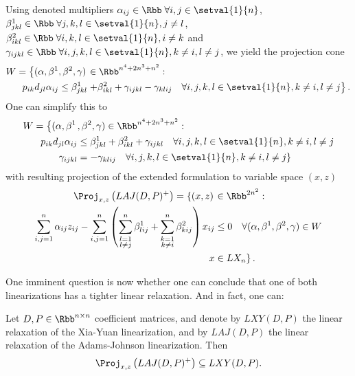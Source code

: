 Using denoted multipliers $\alpha_{ij}\in\Rbb\;\forall i,j\in\setval{1}{n}$, $\beta^1_{jkl}\in\Rbb\;\forall j,k,l\in\setval{1}{n}, j\neq l$, $\beta^2_{ikl}\in\Rbb\;\forall i,k,l\in\setval{1}{n}, i\neq k$ and $\gamma_{ijkl}\in\Rbb\;\forall i,j,k,l\in\setval{1}{n}, k\neq i, l\neq j$, we yield the projection cone
\begin{align*}
	W = \left\{(\alpha,\beta^1,\beta^2,\gamma)\right.&\in\Rbb^{n^4+2n^3+n^2}:\\
	p_{ik}d_{jl}\alpha_{ij}\leq \beta^1_{jkl} &\left.+ \beta^2_{ikl} + \gamma_{ijkl}-\gamma_{klij}\quad\forall i,j,k,l \in\setval{1}{n}, k\neq i, l\neq j\right\}.
\end{align*}
One can simplify this to
\begin{align}
	W = \left\{(\alpha,\beta^1\right.&,\beta^2,\gamma)\in\Rbb^{n^4+2n^3+n^2}:\notag\\
	\label{eq:proj_cone:1}
	p_{ik}d_{jl}\alpha_{ij}&\leq \beta^1_{jkl} + \beta^2_{ikl} + \gamma_{ijkl}\quad\forall i,j,k,l \in\setval{1}{n}, k\neq i, l\neq j\\
	\label{eq:proj_cone:2}
	\gamma_{ijkl}&\left.=-\gamma_{klij}\quad\forall i,j,k,l\in\setval{1}{n}, k\neq i, l\neq j\right\}
\end{align}
with resulting projection of the extended formulation to variable space $(x,z)$
\begin{align*}
	\Proj_{x,z}\left(LAJ(D,P)^+\right) = \left\{(x,z)\right.&\in\Rbb^{2n^2}:\\
	\sum_{i,j=1}^n\alpha_{ij}z_{ij} - \sum_{i,j=1}^n \left(\sum_{\substack{l=1\\l\neq j}}^n \beta^1_{lij} + \sum_{\substack{k=1\\k\neq i}}^n\beta^2_{kij}\right)x_{ij}&\leq 0\quad\forall (\alpha,\beta^1,\beta^2,\gamma)\in W\\
	x&\left.\in LX_n\right\}.
\end{align*}

One imminent question is now whether one can conclude that one of both linearizations has a tighter linear relaxation. And in fact, one can:
\begin{theorem}
	Let $D, P\in\Rbb^{n\times n}$ coefficient matrices, and denote by $LXY(D,P)$ the linear relaxation of the Xia-Yuan linearization, and by $LAJ(D,P)$ the linear relaxation of the Adams-Johnson linearization. Then
	\begin{equation*}
		\Proj_{x,z}\left(LAJ(D,P)^+\right) \subseteq LXY(D,P).
	\end{equation*}
	\label{theorem:AJbesserXY}
\end{theorem}

